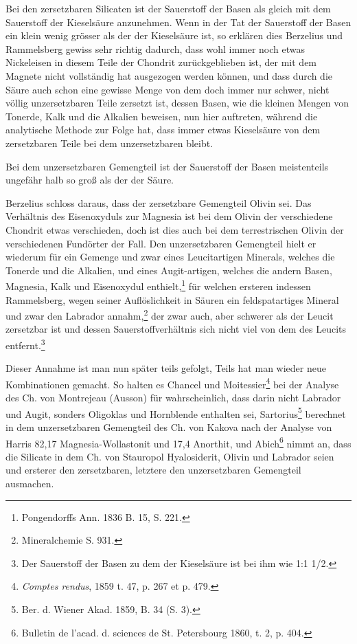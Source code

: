 \documentclass[a4paper, 11pt, oneside]{article}
\begin{document}
Bei den zersetzbaren Silicaten ist der Sauerstoff der Basen als gleich mit dem Sauerstoff der Kieselsäure anzunehmen. Wenn in der Tat der Sauerstoff der Basen ein klein wenig grösser als der der Kieselsäure ist, so erklären dies Berzelius und Rammelsberg gewiss sehr richtig dadurch, dass wohl immer noch etwas Nickeleisen in diesem Teile der Chondrit zurückgeblieben ist, der mit dem Magnete nicht vollständig hat ausgezogen werden können, und dass durch die Säure auch schon eine gewisse Menge von dem doch immer nur schwer, nicht völlig unzersetzbaren Teile zersetzt ist, dessen Basen, wie die kleinen Mengen von Tonerde, Kalk und die Alkalien beweisen, nun hier auftreten, während die analytische Methode zur Folge hat, dass immer etwas Kieselsäure von dem zersetzbaren Teile bei dem unzersetzbaren bleibt.

Bei dem unzersetzbaren Gemengteil ist der Sauerstoff der Basen meistenteils ungefähr halb so groß als der der Säure.

Berzelius schloss daraus, dass der zersetzbare Gemengteil Olivin sei. Das Verhältnis des Eisenoxyduls zur Magnesia ist bei dem Olivin der verschiedene Chondrit etwas verschieden, doch ist dies auch bei dem terrestrischen Olivin der verschiedenen Fundörter der Fall. Den unzersetzbaren Gemengteil hielt er wiederum für ein Gemenge und zwar eines Leucitartigen Minerals, welches die Tonerde und die Alkalien, und eines Augit-artigen, welches die andern Basen, Magnesia, Kalk und Eisenoxydul enthielt,\footnote{Pongendorffs Ann. 1836 B. 15, S. 221.} für welchen ersteren indessen Rammelsberg, wegen seiner Auflöslichkeit in Säuren ein feldspatartiges Mineral und zwar den Labrador annahm,\footnote{Mineralchemie S. 931.} der zwar auch, aber schwerer als der Leucit zersetzbar ist und dessen Sauerstoffverhältnis sich nicht viel von dem des Leucits entfernt.\footnote{Der Sauerstoff der Basen zu dem der Kieselsäure ist bei ihm wie 1:1 1/2.}

Dieser Annahme ist man nun später teils gefolgt, Teils hat man wieder neue Kombinationen gemacht. So halten es Chancel und Moitessier\footnote{\emph{Comptes rendus}, 1859 t. 47, p. 267 et p. 479.} bei der Analyse des Ch. von Montrejeau (Ausson) für wahrscheinlich, dass darin nicht Labrador und Augit, sonders Oligoklas und Hornblende enthalten sei, Sartorius\footnote{Ber. d. Wiener Akad. 1859, B. 34 (S. 3).} berechnet in dem unzersetzbaren Gemengteil des Ch. von Kakova nach der Analyse von Harris 82,17 Magnesia-Wollastonit und 17,4 Anorthit, und Abich\footnote{Bulletin de l'acad. d. sciences de St. Petersbourg 1860, t. 2, p. 404.} nimmt an, dass die Silicate in dem Ch. von Stauropol Hyalosiderit, Olivin und Labrador seien und ersterer den zersetzbaren, letztere den unzersetzbaren Gemengteil ausmachen.
\end{document}
